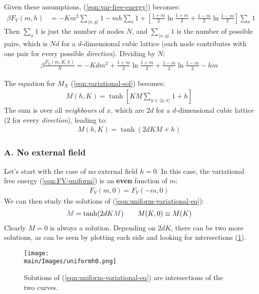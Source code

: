 \documentclass[../../main.tex]{subfiles}
\begin{document}
\medskip

Given these assumptions, (\ref{eqn:var-free-energy}) becomes:
\begin{align*}
    \beta F_V(m, h) &= -K m^2 \sum_{\langle x,y \rangle} 1 - mh\sum_x1 + \left[\frac{1+m}{2} \ln \frac{1+m}{2} + \frac{1-m}{2} \ln \frac{1-m}{2} \right] \sum_x 1 
\end{align*}
Then $\sum_x 1$ is just the number of nodes $N$, and $\sum_{\langle x,y \rangle} 1$ is the number of possible pairs, which is $N d$ for a $d$-dimensional cubic lattice (each node contributes with one pair for every possible \textit{direction}). Dividing by $N$:
\begin{align}\label{eqn:FV-uniform}
    \beta \frac{F_V(m,K,h)}{N} = - K d m^2 + \frac{1+m}{2} \ln \frac{1+m}{2} + \frac{1-m}{2} \ln \frac{1-m}{2} - hm   
\end{align}

The equation for $M_X$ (\ref{eqn:variational-sol}) becomes:
\begin{align*}
    M(h, K) = \tanh \left[KM \sum_{y \in \langle y, x\rangle} 1 + h\right]
\end{align*}
The sum is over all \textit{neighbours} of $x$, which are $2d$ for a $d$-dimensional cubic lattice ($2$ for every \textit{direction}), leading to:
\begin{align}
    \label{eqn:uniform-variational-eq}
    M(h,K) = \tanh(2dKM + h)
\end{align} 

\subsubsection{A. No external field}
Let's start with the case of no external field $h=0$. 
In this case, the variational free energy (\ref{eqn:FV-uniform}) is an \textbf{even}  function of $m$: 
\begin{align*}
    F_V(m,0) = F_V(-m,0)
\end{align*}
We can then study the solutions of (\ref{eqn:uniform-variational-eq}):
\begin{align}\label{eqn:h0case}
    \textcolor{Blue}{M} = \tanh(2dK\textcolor{Blue}{M}) \qquad M(K,0) \equiv M(K)
\end{align}
Clearly $M=0$ is always a solution. Depending on $2dK$, there can be two more solutions, as can be seen by plotting each side and looking for intersections (\ref{fig:uniformh0}).

\begin{figure}[H]
    \centering
    \texttt{[image: \\main/Images/uniformh0.png]}
    \caption{Solutions of (\ref{eqn:uniform-variational-eq}) are intersections of the two curves.}
    \label{fig:uniformh0}
\end{figure}
\end{document}
